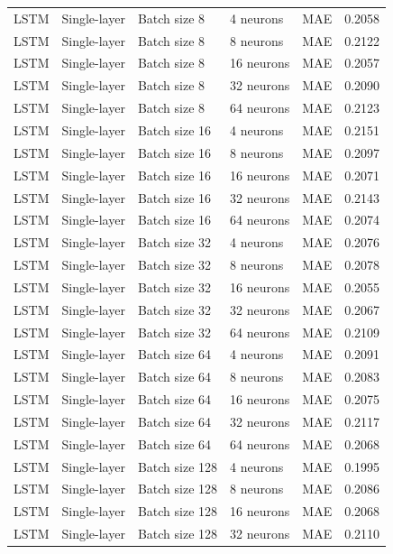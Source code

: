 \begin{landscape}
\begin{longtable}{p{2.2cm}p{3cm}p{3.5cm}p{3.2cm}p{1.6cm}p{1.8cm}}
LSTM & Single-layer & Batch size 8   & 4 neurons  & MAE  & 0.2058 \\
LSTM & Single-layer & Batch size 8   & 8 neurons  & MAE  & 0.2122 \\
LSTM & Single-layer & Batch size 8   & 16 neurons & MAE  & 0.2057 \\
LSTM & Single-layer & Batch size 8   & 32 neurons & MAE  & 0.2090 \\
LSTM & Single-layer & Batch size 8   & 64 neurons & MAE  & 0.2123 \\
LSTM & Single-layer & Batch size 16  & 4 neurons  & MAE  & 0.2151 \\
LSTM & Single-layer & Batch size 16  & 8 neurons  & MAE  & 0.2097 \\
LSTM & Single-layer & Batch size 16  & 16 neurons & MAE  & 0.2071 \\
LSTM & Single-layer & Batch size 16  & 32 neurons & MAE  & 0.2143 \\
LSTM & Single-layer & Batch size 16  & 64 neurons & MAE  & 0.2074 \\
LSTM & Single-layer & Batch size 32  & 4 neurons  & MAE  & 0.2076 \\
LSTM & Single-layer & Batch size 32  & 8 neurons  & MAE  & 0.2078 \\
LSTM & Single-layer & Batch size 32  & 16 neurons & MAE  & 0.2055 \\
LSTM & Single-layer & Batch size 32  & 32 neurons & MAE  & 0.2067 \\
LSTM & Single-layer & Batch size 32  & 64 neurons & MAE  & 0.2109 \\
LSTM & Single-layer & Batch size 64  & 4 neurons  & MAE  & 0.2091 \\
LSTM & Single-layer & Batch size 64  & 8 neurons  & MAE  & 0.2083 \\
LSTM & Single-layer & Batch size 64  & 16 neurons & MAE  & 0.2075 \\
LSTM & Single-layer & Batch size 64  & 32 neurons & MAE  & 0.2117 \\
LSTM & Single-layer & Batch size 64  & 64 neurons & MAE  & 0.2068 \\
LSTM & Single-layer & Batch size 128 & 4 neurons  & MAE  & 0.1995 \\
LSTM & Single-layer & Batch size 128 & 8 neurons  & MAE  & 0.2086 \\
LSTM & Single-layer & Batch size 128 & 16 neurons & MAE  & 0.2068 \\
LSTM & Single-layer & Batch size 128 & 32 neurons & MAE  & 0.2110 \\

\end{longtable}
\end{landscape}
